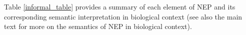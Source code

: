 Table \ref{informal_table} provides a summary of each element of NEP and its corresponding semantic interpretation in biological context (see also the main text for more on the semantics of NEP in biological context).

\begin{comment}
	The network can equivalently be represented as an adjacency matrix $M$, whereby a non-zero entry $m_{jk}$ indicates the existence of an interaction between genes $g_j$ and $g_k$
	in which the latter is the target of the former.
	The sign of a non-zero entry in $M$ indicates whether $g_j$'s effect on its target $g_k$ is promotional or inhibitory in nature, indicated with
	$+1$ or $-1$, respectively.
	A hypothetical Oracle advice (OA) on all or some of the genes simulates the evolutionary pressure on the
	network, and
	is represented as a ternary sequence $A = (a_1,a_2,\dots,a_n)$ where: $a_j=+1$ ($a_j=-1$) implies
	the organism would be better off conserving (deleting) $g_j$; $a_j=0$ implies the Oracle has no opinion on $g_j$.
	While $m_{jk}$ describes what the effect of $g_j$ on $g_k$ actually \textit{is}, $a_k$ describes whether that effect \textit{should} ideally be.
	An interaction $m_{jk}$
	is beneficial if it is in agreement with what the Oracle
	says $g_k$ should be (i.e. either $(m_{jk}=+1$ AND $a_k=+1)$ OR $(m_{jk}=-1$ AND $a_k=-1)$), and damaging if it is
	in disagreement with what the Oracle says $g_k$ should be (i.e. either $(m_{jk}=+1$ AND $a_k=-1)$ OR $(m_{jk}=-1$ AND $a_k=+1)$).
	Each gene $g_j$ is henceforth assigned a benefit (damage) score $b_j$ ($d_j$) depending on how many beneficial (damaging)
	interactions it \textit{projects} onto or \textit{attracts} from other genes through its
	outgoing and incoming edges, respectively.
	Each beneficial (damaging) interaction therefore adds $|m_{jk}|$ to the benefit (damage) score of both the source gene $g_j$ and the target gene $g_k$.
	A gene can therefore have both non-zero benefit and damage score under a given pressure scenario, and so the optimization problem is:
	what subset of genes should be conserved and which should be deleted (=define $f$) so as to maximize (minimize) the number of
	interactions that are in agreement (disagreement) with the OA?
	The OA can be imposed by conserving (deleting) every gene $\boldsymbol{g_j}$ where $a_j = +1$ ($a_j=-1$).
	However,
	conserving $\boldsymbol{g_j}$ can inadvertently contribute to a violation of  the OA if
	$g_j$ happens to be a promoter (inhibitor) of one or more $g_k$ where $a_k=-1$($a_k=+1$), and
	deleting $\boldsymbol{g_j}$ can inadvertently contribute to a violation of the OA if $g_j$
	happens to be a promoter (repressor) of one or more $g_k$ where $a_k=+1$ ($a_k=-1$).
	The idealistic pursuit of enforcing an OA is complicated by the reality of network connectivity.
\end{comment}
\printbibliography

